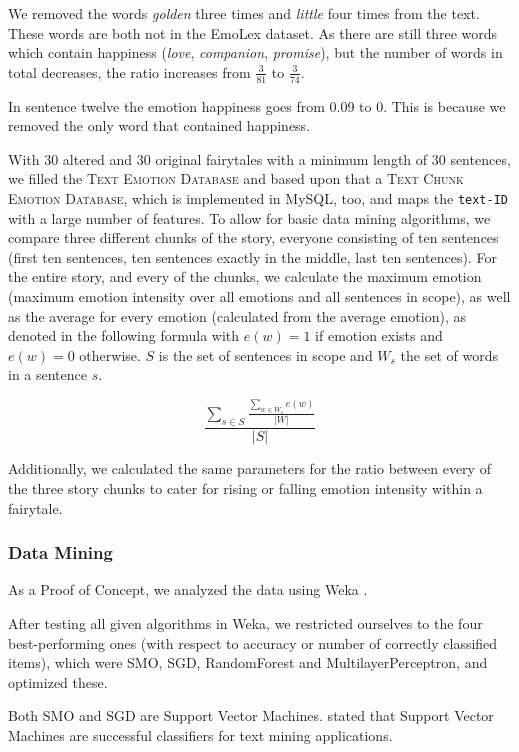 \documentclass[letterpaper]{article}
\begin{document}
We removed the words \textit{golden} three times and \textit{little} four times from the text. These words are both not in the EmoLex dataset. As there are still three words which contain happiness (\textit{love}, \textit{companion}, \textit{promise}), but the number of words in total decreases, the ratio increases from $\frac{3}{81}$ to $\frac{3}{74}$.

In sentence twelve the emotion happiness goes from 0.09 to 0. This is because we removed the only word that contained happiness. 

With 30 altered and 30 original fairytales with a minimum length of 30 sentences, we filled the \textsc{Text Emotion Database} and based upon that a \textsc{Text Chunk Emotion Database}, which is implemented in MySQL, too, and maps the \texttt{text-ID} with a large number of features. To allow for basic data mining algorithms, we compare three different chunks of the story, everyone consisting of ten sentences (first ten sentences, ten sentences exactly in the middle, last ten sentences). For the entire story, and every of the chunks, we calculate the maximum emotion (maximum emotion intensity over all emotions and all sentences in scope), as well as the average for every emotion (calculated from the average emotion), as denoted in the following formula with $e(w)=1$ if emotion exists and $e(w)=0$ otherwise. $S$ is the set of sentences in scope and $W_{s}$ the set of words in a sentence $s$. 

$$\frac{\sum\limits_{s \in S}{\frac{\sum\limits_{w \in W_s}{e(w)}}{\vert W\vert}}}{\vert S\vert}$$

Additionally, we calculated the same parameters for the ratio between every of the three story chunks to cater for rising or falling emotion intensity within a fairytale. 
\subsubsection{Data Mining}
As a Proof of Concept, we analyzed the data using Weka \cite{garner1995weka}. 

After testing all given algorithms in Weka, we restricted ourselves to the four best-performing ones (with respect to accuracy or number of correctly classified items), which were SMO, SGD, RandomForest and MultilayerPerceptron, and optimized these. 

Both SMO and SGD are Support Vector Machines. \cite{hotho2005brief} stated that Support Vector Machines are successful classifiers for text mining applications. 
\end{document}
